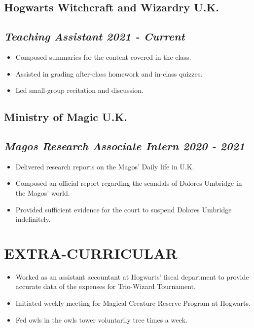 \documentclass{danwyk_resume}[2022/01/23]
\begin{document}
\begin{spacing}{0.5}
\subsection{\bf Hogwarts Witchcraft and Wizardry  \mdseries\hfill U.K.} 
\subsection{\itshape Teaching Assistant \upshape\hfill 2021 - Current}
    \begin{itemize}
    \setlength{\itemsep}{0pt}
    \setlength{\parsep}{0pt}
    \setlength{\parskip}{5pt}
        \item Composed summaries for the content covered in the class.
        \item Assisted in grading after-class homework and in-class quizzes.
        \item Led small-group recitation and discussion.
    \end{itemize} 
    
\subsection{\bf Ministry of Magic \mdseries\hfill U.K.} 
\subsection{\itshape Magos Research Associate Intern \upshape\hfill 2020 - 2021}
    \begin{itemize}
    \setlength{\itemsep}{0pt}
    \setlength{\parsep}{10pt}
    \setlength{\parskip}{5pt}
        \item Delivered research reports on the Magos' Daily life in U.K.
        \item Composed an official report regarding the scandals of Dolores Umbridge in the Magos' world.
        \item Provided sufficient evidence for the court to suspend Dolores Umbridge indefinitely.
    \end{itemize}

\section{EXTRA-CURRICULAR}
    \begin{itemize}
    \setlength{\itemsep}{0pt}
    \setlength{\parsep}{0pt}
    \setlength{\parskip}{5pt}
        \item Worked as an assistant accountant at Hogwarts' fiscal department to provide accurate data of the expenses for Trio-Wizard Tournament.
        \item Initiated weekly meeting for Magical Creature Reserve Program at Hogwarts.
        \item Fed owls in the owls tower voluntarily tree times a week.
    \end{itemize}

\end{spacing}
\end{document}
